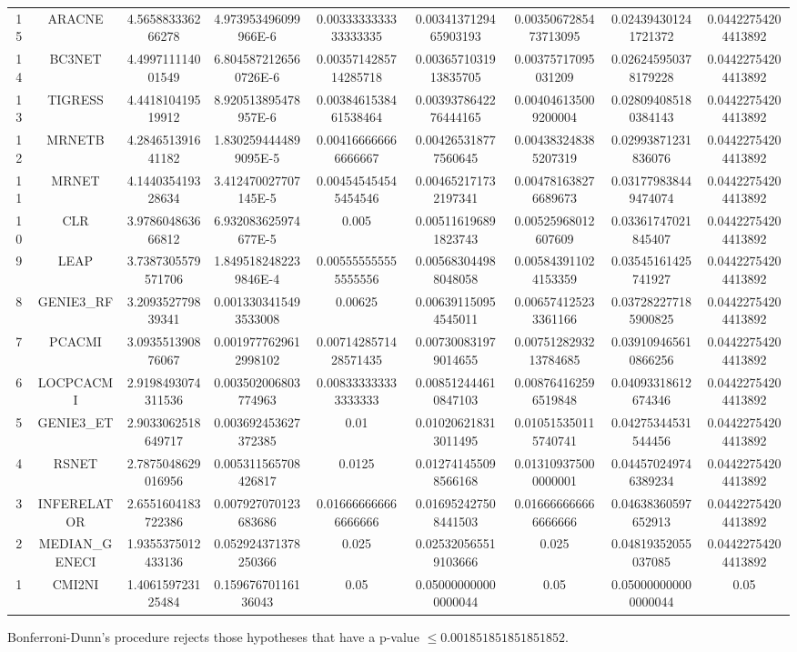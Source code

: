 \documentclass[a4paper,10pt]{article}
\begin{document}
\begin{landscape}
\begin{table}[!htp]
\begin{tabular}{ccccccccc}
15&ARACNE&4.565883336266278&4.973953496099966E-6&0.0033333333333333335&0.0034137129465903193&0.0035067285473713095&0.024394301241721372&0.04422754204413892\\
14&BC3NET&4.499711114001549&6.8045872126560726E-6&0.0035714285714285718&0.0036571031913835705&0.00375717095031209&0.026245950378179228&0.04422754204413892\\
13&TIGRESS&4.441810419519912&8.920513895478957E-6&0.0038461538461538464&0.0039378642276444165&0.004046135009200004&0.028094085180384143&0.04422754204413892\\
12&MRNETB&4.284651391641182&1.8302594444899095E-5&0.004166666666666667&0.004265318777560645&0.004383248385207319&0.02993871231836076&0.04422754204413892\\
11&MRNET&4.144035419328634&3.412470027707145E-5&0.004545454545454546&0.004652171732197341&0.004781638276689673&0.031779838449474074&0.04422754204413892\\
10&CLR&3.978604863666812&6.932083625974677E-5&0.005&0.005116196891823743&0.00525968012607609&0.03361747021845407&0.04422754204413892\\
9&LEAP&3.7387305579571706&1.8495182482239846E-4&0.005555555555555556&0.005683044988048058&0.005843911024153359&0.03545161425741927&0.04422754204413892\\
8&GENIE3_RF&3.209352779839341&0.0013303415493533008&0.00625&0.006391150954545011&0.006574125233361166&0.037282277185900825&0.04422754204413892\\
7&PCACMI&3.093551390876067&0.0019777629612998102&0.0071428571428571435&0.007300831979014655&0.0075128293213784685&0.039109465610866256&0.04422754204413892\\
6&LOCPCACMI&2.9198493074311536&0.003502006803774963&0.008333333333333333&0.008512444610847103&0.008764162596519848&0.04093318612674346&0.04422754204413892\\
5&GENIE3_ET&2.9033062518649717&0.003692453627372385&0.01&0.010206218313011495&0.010515350115740741&0.04275344531544456&0.04422754204413892\\
4&RSNET&2.7875048629016956&0.005311565708426817&0.0125&0.012741455098566168&0.013109375000000001&0.044570249746389234&0.04422754204413892\\
3&INFERELATOR&2.6551604183722386&0.007927070123683686&0.016666666666666666&0.016952427508441503&0.016666666666666666&0.04638360597652913&0.04422754204413892\\
2&MEDIAN_GENECI&1.9355375012433136&0.052924371378250366&0.025&0.025320565519103666&0.025&0.04819352055037085&0.04422754204413892\\
1&CMI2NI&1.406159723125484&0.15967670116136043&0.05&0.050000000000000044&0.05&0.050000000000000044&0.05\\
\hline
\end{tabular}
\end{table}
Bonferroni-Dunn's procedure rejects those hypotheses that have a p-value $\le0.001851851851851852$.



\end{landscape}
\end{document}
